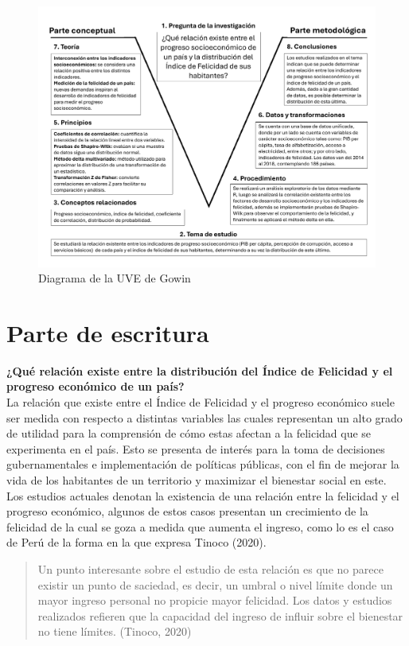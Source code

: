 \begin{figure}[H]
        \centering
        \caption{Diagrama de la UVE de Gowin}
        \label{uve_gowin}
        \includegraphics[width = 17cm]{figures/Diagrama UVE de Gowin.pdf}
    \end{figure}

\newpage

\section{Parte de escritura}
\textbf{¿Qué relación existe entre la distribución del Índice de Felicidad y el progreso económico de un país?} \\

La relación que existe entre el Índice de Felicidad y el progreso económico suele ser medida con respecto a distintas variables las cuales representan un alto grado de utilidad para la comprensión de cómo estas afectan a la felicidad que se experimenta en el país. Esto se presenta de interés para la toma de decisiones gubernamentales e implementación de políticas públicas, con el fin de mejorar la vida de los habitantes de un territorio y maximizar el bienestar social en este.\\
    
Los estudios actuales denotan la existencia de una relación entre la felicidad y el progreso económico, algunos de estos casos presentan un crecimiento de la felicidad de la cual se goza a medida que aumenta el ingreso, como lo es el caso de Perú de la forma en la que expresa Tinoco (2020). 
\begin{quote}
    Un punto interesante sobre el estudio de esta relación es que no parece existir un punto de saciedad, es decir, un umbral o nivel límite donde un mayor ingreso personal no propicie mayor felicidad. Los datos y estudios realizados refieren que la capacidad del ingreso de influir sobre el bienestar no tiene límites.
    \flushright (Tinoco, 2020) 
\end{quote}

